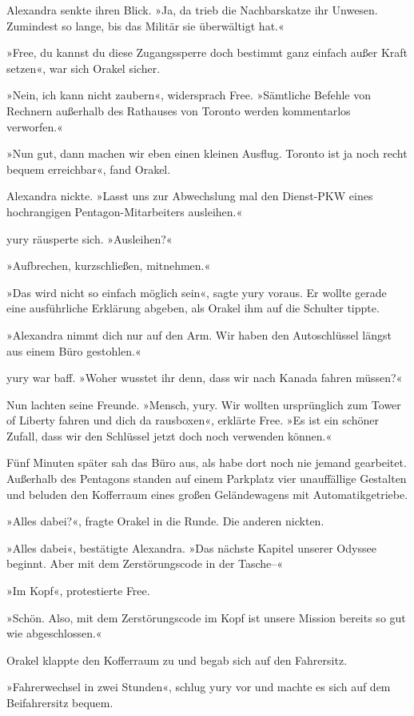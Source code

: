 Alexandra senkte ihren Blick. »Ja, da trieb die Nachbarskatze ihr Unwesen. Zumindest so lange, bis das Militär sie überwältigt hat.«

»Free, du kannst du diese Zugangssperre doch bestimmt ganz einfach außer Kraft setzen«, war sich Orakel sicher.

»Nein, ich kann nicht zaubern«, widersprach Free. »Sämtliche Befehle von Rechnern außerhalb des Rathauses von Toronto werden kommentarlos verworfen.«

»Nun gut, dann machen wir eben einen kleinen Ausflug. Toronto ist ja noch recht bequem erreichbar«, fand Orakel.

Alexandra nickte. »Lasst uns zur Abwechslung mal den Dienst-PKW eines hochrangigen Pentagon-Mitarbeiters ausleihen.«

yury räusperte sich. »Ausleihen?«

»Aufbrechen, kurzschließen, mitnehmen.«

»Das wird nicht so einfach möglich sein«, sagte yury voraus. Er wollte gerade eine ausführliche Erklärung abgeben, als Orakel ihm auf die Schulter tippte.

»Alexandra nimmt dich nur auf den Arm. Wir haben den Autoschlüssel längst aus einem Büro gestohlen.«

yury war baff. »Woher wusstet ihr denn, dass wir nach Kanada fahren müssen?«

Nun lachten seine Freunde. »Mensch, yury. Wir wollten ursprünglich zum Tower of Liberty fahren und dich da rausboxen«, erklärte Free. »Es ist ein schöner Zufall, dass wir den Schlüssel jetzt doch noch verwenden können.«

Fünf Minuten später sah das Büro aus, als habe dort noch nie jemand gearbeitet. Außerhalb des Pentagons standen auf einem Parkplatz vier unauffällige Gestalten und beluden den Kofferraum eines großen Geländewagens mit Automatikgetriebe.

»Alles dabei?«, fragte Orakel in die Runde. Die anderen nickten.

»Alles dabei«, bestätigte Alexandra. »Das nächste Kapitel unserer Odyssee beginnt. Aber mit dem Zerstörungscode in der Tasche–«

»Im Kopf«, protestierte Free.

»Schön. Also, mit dem Zerstörungscode im Kopf ist unsere Mission bereits so gut wie abgeschlossen.«

Orakel klappte den Kofferraum zu und begab sich auf den Fahrersitz.

»Fahrerwechsel in zwei Stunden«, schlug yury vor und machte es sich auf dem Beifahrersitz bequem.

